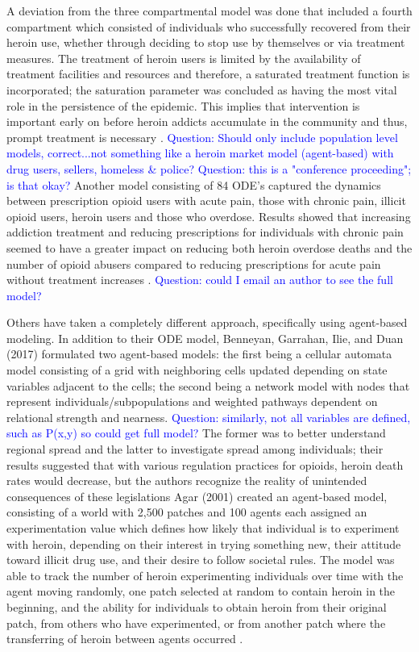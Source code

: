 \documentclass[12pt]{article}
\begin{document}
A deviation from the three compartmental model was done that included a fourth compartment which consisted of individuals who successfully recovered from their heroin use, whether through deciding to stop use by themselves or via treatment measures. The treatment of heroin users is limited by the availability of treatment facilities and resources and therefore, a saturated treatment function is incorporated; the saturation parameter was concluded as having the most vital role in the persistence of the epidemic. This implies that intervention is important early on before heroin addicts accumulate in the community and thus, prompt treatment is necessary \cite{Wangari}. 
\textcolor{blue}{Question: Should only include population level models, correct...not something like a heroin market model (agent-based) with drug users, sellers, homeless \& police?} %
\textcolor{blue}{Question: this is a "conference proceeding"; is that okay?} Another model consisting of 84 ODE's captured the dynamics between prescription opioid users with acute pain, those with chronic pain, illicit opioid users, heroin users and those who overdose. Results showed that increasing addiction treatment and reducing prescriptions for individuals with chronic pain seemed to have a greater impact on reducing both heroin overdose deaths and the number of opioid abusers compared to reducing prescriptions for acute pain without treatment increases \cite{Benneyan}. \textcolor{blue}{Question: could I email an author to see the full model?} 

Others have taken a completely different approach, specifically using agent-based modeling. In addition to their ODE model, Benneyan, Garrahan, Ilie, and Duan (2017) formulated two agent-based models: the first being a cellular automata model consisting of a grid with neighboring cells updated depending on state variables adjacent to the cells; the second being a network model with nodes that represent individuals/subpopulations and weighted pathways dependent on relational strength and nearness. \textcolor{blue}{Question: similarly, not all variables are defined, such as P(x,y) so could get full model?} The former was to better understand regional spread and the latter to investigate spread among individuals; their results suggested that with various regulation practices for opioids, heroin death rates would decrease, but the authors recognize the reality of unintended consequences of these legislations \cite{Benneyan} Agar (2001) created an agent-based model, consisting of a world with 2,500 patches and 100 agents each assigned an experimentation value which defines how likely that individual is to experiment with heroin, depending on their interest in trying something new, their attitude toward illicit drug use, and their desire to follow societal rules. The model was able to track the number of heroin experimenting individuals over time with the agent moving randomly, one patch selected at random to contain heroin in the beginning, and the ability for individuals to obtain heroin from their original patch, from others who have experimented, or from another patch where the transferring of heroin between agents occurred \cite{Agar}.
\end{document}
